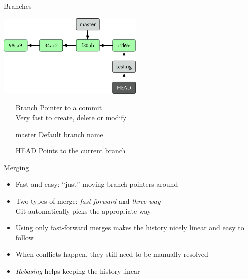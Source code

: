 \documentclass{beamer}
\begin{document}
\begin{frame}{Branches}
  \begin{center}
    \includegraphics[height=4cm]{images/fig0307.pdf}
  \end{center}
  \begin{itemize}
  \item[Branch] Pointer to a commit\\Very fast to create, delete or modify
  \item[master] Default branch name
  \item[HEAD] Points to the current branch
  \end{itemize}
\end{frame}

\begin{frame}{Merging}
  \begin{itemize}
  \item Fast and easy: ``just'' moving branch pointers around
  \item Two types of merge: \emph{fast-forward} and \emph{three-way}\\Git automatically picks the appropriate way
  \item Using only fast-forward merges makes the history nicely linear and easy to follow
  \item When conflicts happen, they still need to be manually resolved
  \item \emph{Rebasing} helps keeping the history linear
  \end{itemize}
\end{frame}
\end{document}

